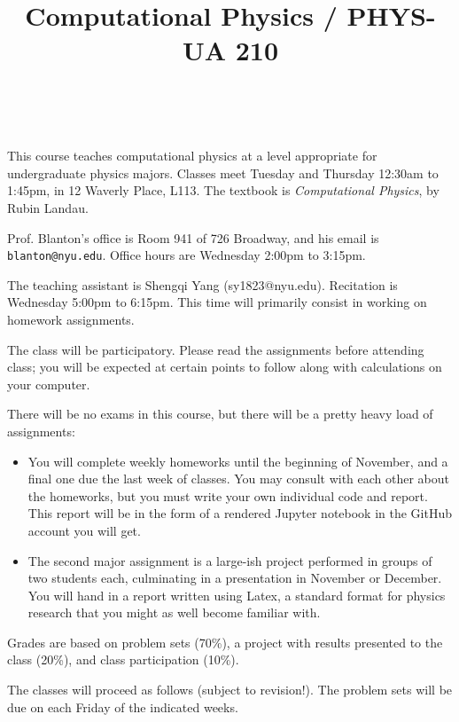 \documentclass[11pt, preprint]{aastex}
\begin{document}
\title{\bf Computational Physics / PHYS-UA 210}
~
~

\noindent This course teaches computational physics at a level appropriate for
undergraduate physics majors.  Classes meet Tuesday and Thursday
12:30am to 1:45pm, in 12 Waverly Place, L113.  The textbook is {\it
 Computational Physics}, by Rubin Landau.

\noindent Prof. Blanton's office is Room 941 of 726 Broadway, and his
email is {\tt blanton@nyu.edu}.  Office hours are Wednesday 2:00pm to
3:15pm.

\noindent The teaching assistant is Shengqi Yang
(sy1823@nyu.edu). Recitation is Wednesday 5:00pm to 6:15pm. This time
will primarily consist in working on homework assignments.

\noindent The class will be participatory. Please read the assignments
before attending class; you will be expected at certain points to
follow along with calculations on your computer.

\noindent There will be no exams in this course, but there will be a
pretty heavy load of assignments:
\begin{itemize}
\item You will complete weekly homeworks until the beginning of
  November, and a final one due the last week of classes. You may
  consult with each other about the homeworks, but you must write your
  own individual code and report. This report will be in the form of a
  rendered Jupyter notebook in the GitHub account you will get.
\item The second major assignment is a large-ish project performed in
  groups of two students each, culminating in a presentation in
  November or December. You will hand in a report written using Latex,
  a standard format for physics research that you might as well become
  familiar with.
\end{itemize}

\noindent Grades are based on problem sets (70\%), a project with
results presented to the class (20\%), and class participation (10\%).

\noindent The classes will proceed as follows (subject to revision!).
The problem sets will be due on each Friday of the indicated weeks.
\end{document}
